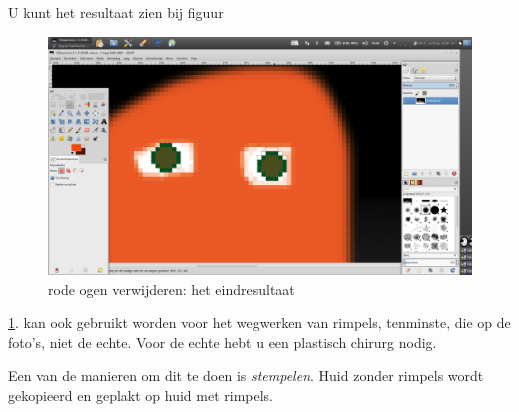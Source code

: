 \documentclass[11pt,a5paper,twoside]{book}
\begin{document}
   U kunt het resultaat zien bij figuur \begin{figure}
    \includegraphics[width=0.90\linewidth]{redeyes/3.png}
    \caption{rode ogen verwijderen: het eindresultaat}
    \label{gx:redeyes/3}
   \end{figure}\ref{gx:redeyes/3}.
   \GIMP{} kan ook gebruikt worden voor het wegwerken van rimpels,
    tenminste, die op de foto’s, niet de echte. Voor de echte hebt
    u een plastisch chirurg nodig.

   Een van de manieren om dit te doen is \textit{stempelen}. Huid zonder
    rimpels wordt gekopieerd en geplakt op huid met rimpels.
\end{document}
